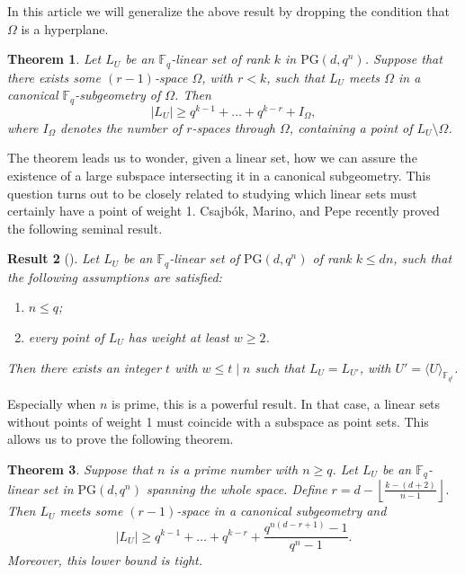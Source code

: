 \documentclass[11pt]{article}
\newtheorem{theorem}{Theorem}[section]
\newtheorem{result}[theorem]{Result}
\theoremstyle{definition}
\newcommand{\F}{{\mathbb F}}
\newcommand{\fq}{{\mathbb F}_{q}}
\newcommand{\PG}{\mathrm{PG}}
\newcommand{\pg}{\PG}
\newcommand{\floor}[1]{\left \lfloor #1 \right \rfloor}
\begin{document}
In this article we will generalize the above result by dropping the condition that $\Omega$ is a hyperplane.

\begin{theorem}
 \label{thm:OurBound}
 Let $L_U$ be an $\fq$-linear set of rank $k$ in $\PG(d,q^n)$.
 Suppose that there exists some $(r-1)$-space $\Omega$, with $r < k$, such that $L_U$ meets $\Omega$ in a canonical $\fq$-subgeometry of $\Omega$.
 Then
 \begin{equation*}
  |L_U| \geq q^{k-1} + \ldots + q^{k-r} + I_\Omega,
 \end{equation*}
 where $I_\Omega$ denotes the number of $r$-spaces through $\Omega$, containing a point of $L_U \setminus \Omega$.
\end{theorem}

The theorem leads us to wonder, given a linear set, how we can assure the existence of a large subspace intersecting it in a canonical subgeometry.
This question turns out to be closely related to studying which linear sets must certainly have a point of weight 1.
Csajbók, Marino, and Pepe \cite{csajbok2023maximum} recently proved the following seminal result.

\begin{result}[{\cite[Theorem 2]{csajbok2023maximum}}] \label{th:pointweightgreaterfield}
Let $L_U$ be an $\F_q$-linear set of $\PG(d,q^n)$ of rank $k \leq dn$, such that the following assumptions are satisfied:
\begin{enumerate}
    \item $n\leq q$;
    \item every point of $L_U$ has weight at least $w \geq 2$.
\end{enumerate}
Then there exists an integer $t$ with $w \leq t \mid n$ such that $L_U=L_{U'}$, with $U'=\langle U \rangle_{\F_{q^t}}$.
\end{result}

Especially when $n$ is prime, this is a powerful result.
In that case, a linear sets without points of weight 1 must coincide with a subspace as point sets.
This allows us to prove the following theorem.

\begin{theorem} \label{th:prime}
 Suppose that $n$ is a prime number with $n \geq q$.
 Let $L_U$ be an $\fq$-linear set in $\pg(d,q^n)$ spanning the whole space.
 Define $r = d - \floor{\frac{k-(d+2)}{n-1}}$.
 Then $L_U$ meets some $(r-1)$-space in a canonical subgeometry and
 \[
  |L_U| \geq q^{k-1} + \ldots + q^{k-r} + \frac{q^{n(d-r+1)}-1}{q^n-1}.
 \]
 Moreover, this lower bound is tight.
\end{theorem}
\end{document}
